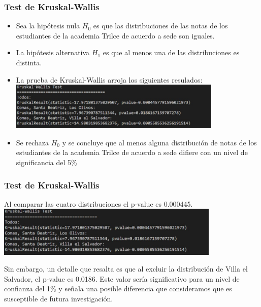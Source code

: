 \begin{frame}
    \frametitle{Test de Kruskal-Wallis}
    \begin{itemize}
        \item Sea la hipótesis nula $H_0$ es que las distribuciones de las notas de los estudiantes de la academia Trilce de acuerdo a sede son iguales.
        \item La hipótesis alternativa $H_1$ es que al menos una de las distribuciones es distinta.
    \end{itemize}
    \begin{itemize}
        \item La prueba de Kruskal-Wallis arroja los siguientes resulados:
        \includegraphics[width=0.8\textwidth]{cap/images/resultados_kruskal.jpg}
        \item Se rechaza $H_0$ y se concluye que al menos alguna distribución de notas de los estudiantes de la academia Trilce de acuerdo a sede difiere con un nivel de significancia del 5\%
    \end{itemize}
\end{frame}

\begin{frame}
    \frametitle{Test de Kruskal-Wallis}
    Al comparar las cuatro distribuciones el p-value es 0.000445. 
    \includegraphics[width=0.8\textwidth]{cap/images/resultados_kruskal.jpg}
    
    Sin embargo, un detalle que resalta es que al excluir la distribución de Villa el Salvador, el p-value es 0.0186.
    Este valor sería significativo para un nivel de confianza del 1\% y señala una posible 
    diferencia que consideramos que es susceptible de futura investigación.
    
\end{frame}